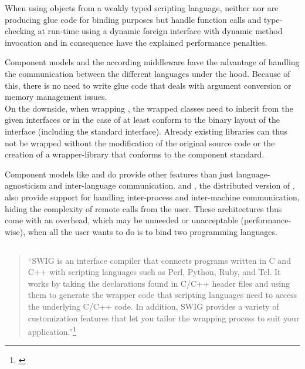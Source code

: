 When using objects from a weakly typed scripting language, neither  nor  are producing glue code for binding purposes but handle function calls and type-checking at run-time using a dynamic foreign interface with dynamic method invocation and in consequence have the explained performance penalties.

Component models and the according middleware have the advantage of handling the communication between the different languages under the hood. Because of this, there is no need to write glue code that deals with argument conversion or memory management issues.\\
On the downside, when wrapping , the wrapped classes need to inherit from the given interfaces or in the case of  at least conform to the binary layout of the interface (including the standard  interface). Already existing libraries can thus not be wrapped without the modification of the original source code or the creation of a wrapper-library that conforms to the component standard.


Component models like  and  do provide other features than just \linebreak language-agnosticism and inter-language communication.  and , the distributed version of , also provide support for handling inter-process and inter-machine communication, hiding the complexity of remote calls from the user. These architectures thus come with an overhead, which may be unneeded or unacceptable (performance-wise), when all the user wants to do is to bind two programming languages.


\newpage
\subsection{}

\begin{quotation}
``SWIG is an interface compiler that connects programs written in C and C++ with scripting languages such as Perl, Python, Ruby, and Tcl. It works by taking the declarations found in C/C++ header files and using them to generate the wrapper code that scripting languages need to access the underlying C/C++ code. In addition, SWIG provides a variety of customization features that let you tailor the wrapping process to suit your application.''\footnote{\citep{SWIGHPExec}}
\end{quotation}

